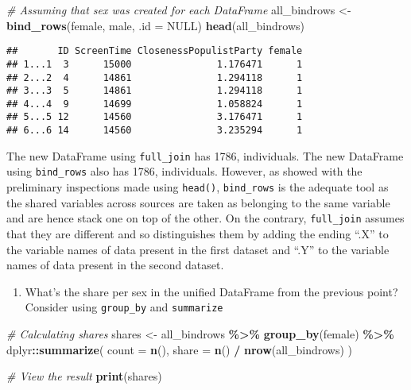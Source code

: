 \documentclass[
]{book}
\newenvironment{Shaded}{\begin{snugshade}}{\end{snugshade}}
\newcommand{\AttributeTok}[1]{\textcolor[rgb]{0.13,0.29,0.53}{#1}}
\newcommand{\CommentTok}[1]{\textcolor[rgb]{0.56,0.35,0.01}{\textit{#1}}}
\newcommand{\ConstantTok}[1]{\textcolor[rgb]{0.56,0.35,0.01}{#1}}
\newcommand{\FunctionTok}[1]{\textcolor[rgb]{0.13,0.29,0.53}{\textbf{#1}}}
\newcommand{\NormalTok}[1]{#1}
\newcommand{\OtherTok}[1]{\textcolor[rgb]{0.56,0.35,0.01}{#1}}
\newcommand{\SpecialCharTok}[1]{\textcolor[rgb]{0.81,0.36,0.00}{\textbf{#1}}}
\providecommand{\tightlist}{%
  \setlength{\itemsep}{0pt}\setlength{\parskip}{0pt}}
\begin{document}
\begin{Shaded}
\begin{Highlighting}[]
\CommentTok{\# Assuming that \textasciigrave{}sex\textasciigrave{} was created for each DataFrame}
\NormalTok{all\_bindrows }\OtherTok{\textless{}{-}} \FunctionTok{bind\_rows}\NormalTok{(female, male, }\AttributeTok{.id =} \ConstantTok{NULL}\NormalTok{)}
\FunctionTok{head}\NormalTok{(all\_bindrows)}
\end{Highlighting}
\end{Shaded}

\begin{verbatim}
##       ID ScreenTime ClosenessPopulistParty female
## 1...1  3      15000               1.176471      1
## 2...2  4      14861               1.294118      1
## 3...3  5      14861               1.294118      1
## 4...4  9      14699               1.058824      1
## 5...5 12      14560               3.176471      1
## 6...6 14      14560               3.235294      1
\end{verbatim}

The new DataFrame using \texttt{full\_join} has 1786, individuals. The new DataFrame using \texttt{bind\_rows} also has 1786, individuals. However, as showed with the preliminary inspections made using \texttt{head()}, \texttt{bind\_rows} is the adequate tool as the shared variables across sources are taken as belonging to the same variable and are hence stack one on top of the other. On the contrary, \texttt{full\_join} assumes that they are different and so distinguishes them by adding the ending ``.X'' to the variable names of data present in the first dataset and ``.Y'' to the variable names of data present in the second dataset.

\begin{enumerate}
\def\labelenumi{\arabic{enumi}.}
\setcounter{enumi}{3}
\tightlist
\item
  What's the share per sex in the unified DataFrame from the previous point? Consider using \texttt{group\_by} and \texttt{summarize}
\end{enumerate}

\begin{Shaded}
\begin{Highlighting}[]
\CommentTok{\# Calculating shares}
\NormalTok{shares }\OtherTok{\textless{}{-}}\NormalTok{ all\_bindrows }\SpecialCharTok{\%\textgreater{}\%}
  \FunctionTok{group\_by}\NormalTok{(female) }\SpecialCharTok{\%\textgreater{}\%}
\NormalTok{  dplyr}\SpecialCharTok{::}\FunctionTok{summarize}\NormalTok{(}
    \AttributeTok{count =} \FunctionTok{n}\NormalTok{(),}
    \AttributeTok{share =} \FunctionTok{n}\NormalTok{() }\SpecialCharTok{/} \FunctionTok{nrow}\NormalTok{(all\_bindrows)}
\NormalTok{  )}

\CommentTok{\# View the result}
\FunctionTok{print}\NormalTok{(shares)}
\end{Highlighting}
\end{Shaded}
\end{document}
